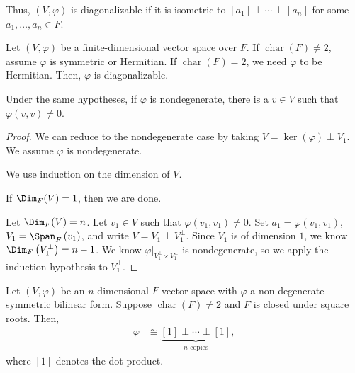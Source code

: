 \documentclass[10pt]{mypackage}
\begin{document}
  Thus, $\left(V,\varphi\right)$ is diagonalizable if it is isometric to $\left[a_1\right]\perp\cdots\perp \left[a_n\right]$ for some $a_1,\dots,a_n\in F$.
  \begin{theorem}
    Let $\left(V,\varphi\right)$ be a finite-dimensional vector space over $F$. If $\operatorname{char}(F) \neq 2$, assume $\varphi$ is symmetric or Hermitian. If $\operatorname{char}(F) = 2$, we need $\varphi$ to be Hermitian. Then, $\varphi$ is diagonalizable.
  \end{theorem}
  \begin{lemma}
    Under the same hypotheses, if $\varphi$ is nondegenerate, there is a $v\in V$ such that $\varphi\left(v,v\right) \neq 0$.
  \end{lemma}
  \begin{proof}
    We can reduce to the nondegenerate case by taking $V = \ker\left(\varphi\right) \perp V_1$. We assume $\varphi$ is nondegenerate.\newline

    We use induction on the dimension of $V$.\newline

    If $\Dim_F(V) = 1$, then we are done.\newline

    Let $\Dim_{F}(V) = n$. Let $v_1\in V$ such that $\varphi\left(v_1,v_1\right)\neq 0$. Set $a_1 = \varphi\left(v_1,v_1\right)$, $V_1 = \Span_{F}\left(v_1\right)$, and write $V = V_1 \perp V_1^{\perp}$. Since $V_1$ is of dimension $1$, we know $\Dim_{F}\left(V_1^{\perp}\right) = n-1$. We know $\varphi|_{V_1^{\perp}\times V_1^{\perp}}$ is nondegenerate, so we apply the induction hypothesis to $V_1^{\perp}$.
  \end{proof}
  \begin{theorem}
    Let $\left(V,\varphi\right)$ be an $n$-dimensional $F$-vector space with $\varphi$ a non-degenerate symmetric bilinear form. Suppose $\operatorname{char}(F) \neq 2$ and $F$ is closed under square roots. Then,
    \begin{align*}
      \varphi &\cong \underbrace{\left[1\right]\perp\cdots\perp \left[1\right]}_{n\text{ copies}},
    \end{align*}
    where $\left[1\right]$ denotes the dot product.
  \end{theorem}
\end{document}
